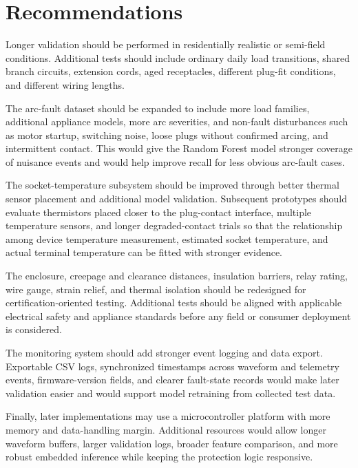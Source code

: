 \section{Recommendations}\label{sec:recommendations}

Longer validation should be performed in residentially realistic or semi-field
conditions. Additional tests should include ordinary daily load transitions,
shared branch circuits, extension cords, aged receptacles, different plug-fit
conditions, and different wiring lengths.

The arc-fault dataset should be expanded to include more load families,
additional appliance models, more arc severities, and non-fault disturbances
such as motor startup, switching noise, loose plugs without confirmed arcing,
and intermittent contact. This would give the Random Forest model stronger
coverage of nuisance events and would help improve recall for less obvious
arc-fault cases.

The socket-temperature subsystem should be improved through better thermal
sensor placement and additional model validation. Subsequent prototypes should
evaluate thermistors placed closer to the plug-contact interface, multiple
temperature sensors, and longer degraded-contact trials so that the relationship
among device temperature measurement, estimated socket temperature, and actual
terminal temperature can be fitted with stronger evidence.

The enclosure, creepage and clearance distances, insulation barriers, relay
rating, wire gauge, strain relief, and thermal isolation should be redesigned
for certification-oriented testing. Additional tests should be aligned with
applicable electrical safety and appliance standards before any field or
consumer deployment is considered.

The monitoring system should add stronger event logging and data export.
Exportable CSV logs, synchronized timestamps across waveform and telemetry
events, firmware-version fields, and clearer fault-state records would make
later validation easier and would support model retraining from collected test
data.

Finally, later implementations may use a microcontroller platform with more
memory and data-handling margin. Additional resources would allow longer
waveform buffers, larger validation logs, broader feature comparison, and more
robust embedded inference while keeping the protection logic responsive.
